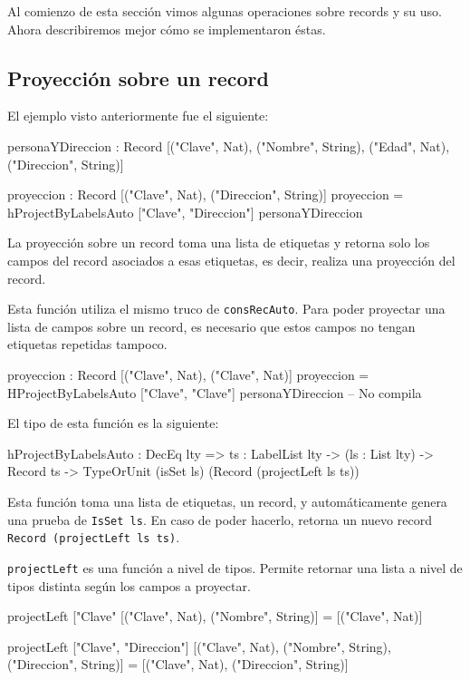 Al comienzo de esta sección vimos algunas operaciones sobre records y su uso. Ahora describiremos mejor cómo se implementaron éstas.

\subsection{Proyección sobre un record}

El ejemplo visto anteriormente fue el siguiente:

\begin{code}
personaYDireccion : Record [("Clave", Nat), ("Nombre", String),
  ("Edad", Nat), ("Direccion", String)]

proyeccion : Record [("Clave", Nat), ("Direccion", String)]
proyeccion = hProjectByLabelsAuto ["Clave", "Direccion"]
  personaYDireccion
\end{code}

La proyección sobre un record toma una lista de etiquetas y retorna solo los campos del record asociados a esas etiquetas, es decir, realiza una proyección del record.

Esta función utiliza el mismo truco de \texttt{consRecAuto}. Para poder proyectar una lista de campos sobre un record, es necesario que estos campos no tengan etiquetas repetidas tampoco.

\begin{code}
proyeccion : Record [("Clave", Nat), ("Clave", Nat)]
proyeccion = HProjectByLabelsAuto ["Clave", "Clave"]
  personaYDireccion
-- No compila
\end{code}

El tipo de esta función es la siguiente:

\begin{code}
hProjectByLabelsAuto : DecEq lty => {ts : LabelList lty} ->
  (ls : List lty) -> Record ts ->
  TypeOrUnit (isSet ls) (Record (projectLeft ls ts))
\end{code}

Esta función toma una lista de etiquetas, un record, y automáticamente genera una prueba de \texttt{IsSet ls}. En caso de poder hacerlo, retorna un nuevo record \texttt{Record (projectLeft ls ts)}.

\texttt{projectLeft} es una función a nivel de tipos. Permite retornar una lista a nivel de tipos distinta según los campos a proyectar.

\begin{code}
projectLeft ["Clave"
  [("Clave", Nat), ("Nombre", String)] =
  [("Clave", Nat)]

projectLeft ["Clave", "Direccion"]
  [("Clave", Nat), ("Nombre", String), ("Direccion", String)] =
  [("Clave", Nat), ("Direccion", String)]
\end{code}

